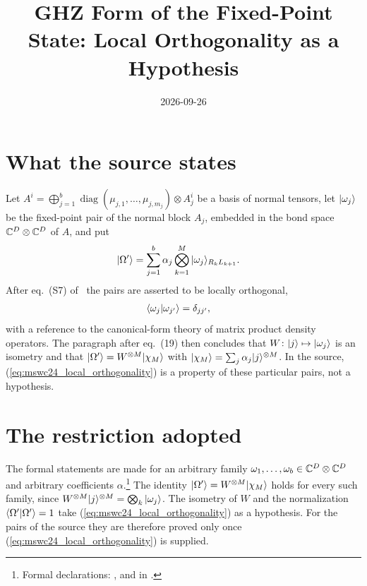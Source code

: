 \documentclass{article}
\title{GHZ Form of the Fixed-Point State: Local Orthogonality as a Hypothesis}
\author{}
\date{2026-09-26}
\begin{document}
\maketitle
{}

\section{What the source states}
Let $A^i=\bigoplus_{j=1}^b\operatorname{diag}(\mu_{j,1},\dots,\mu_{j,m_j})
    \otimes A_j^i$ be a basis of normal tensors, let $|\omega_j\rangle$ be the
fixed-point pair of the normal block $A_j$, embedded in the bond space
$\mathbb{C}^D\otimes\mathbb{C}^D$ of $A$, and put
\begin{align}
    |\Omega'\rangle
     & =\sum_{j=1}^b\alpha_j\bigotimes_{k=1}^{M}|\omega_j\rangle_{R_kL_{k+1}}.
    \label{eq:mswc24_fixed_point_state}
\end{align}
After eq.~(S7) of~\cite{Malz2024Preparation} the pairs are asserted to be
locally orthogonal,
\begin{align}
    \langle \omega_j | \omega_{j'} \rangle & =\delta_{jj'},
    \label{eq:mswc24_local_orthogonality}
\end{align}
with a reference to the canonical-form theory of matrix product density
operators. The paragraph after eq.~(19) then concludes that
$W\colon|j\rangle\mapsto|\omega_j\rangle$ is an isometry and that
$|\Omega'\rangle=W^{\otimes M}|\chi_M\rangle$ with
$|\chi_M\rangle=\sum_j\alpha_j|j\rangle^{\otimes M}$. In the source,
(\ref{eq:mswc24_local_orthogonality}) is a property of these particular pairs,
not a hypothesis.

\section{The restriction adopted}
The formal statements are made for an arbitrary family
$\omega_1,\dots,\omega_b\in\mathbb{C}^D\otimes\mathbb{C}^D$ and arbitrary coefficients
$\alpha$.\footnote{Formal declarations:
    ,
    and  in
    .}
The identity $|\Omega'\rangle=W^{\otimes M}|\chi_M\rangle$ holds for every such
family, since
$W^{\otimes M}|j\rangle^{\otimes M}=\bigotimes_k|\omega_j\rangle$. The isometry of
$W$ and the normalization $\langle \Omega' | \Omega' \rangle=1$ take
(\ref{eq:mswc24_local_orthogonality}) as a hypothesis. For the pairs of the
source they are therefore proved only once
(\ref{eq:mswc24_local_orthogonality}) is supplied.
\end{document}
